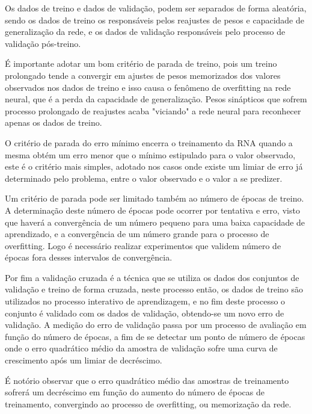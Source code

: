             	Os dados de treino e dados de validação, podem ser separados de forma aleatória, sendo os dados de treino os responsáveis pelos reajustes de pesos e capacidade de generalização da rede, e os dados de validação responsáveis pelo processo de validação pós-treino.
            	
            	É importante adotar um bom critério de parada de treino, pois um treino prolongado tende a convergir em ajustes de pesos memorizados dos valores observados nos dados de treino e isso causa o fenômeno de overfitting na rede neural, que é a perda da capacidade de generalização. Pesos sinápticos que sofrem processo prolongado de reajustes acaba "viciando" a rede neural para reconhecer apenas os dados de treino.
            	
            	O critério de parada do erro mínimo encerra o treinamento da RNA quando a mesma obtém um erro menor que o mínimo estipulado para o valor observado, este é o critério mais simples, adotado nos casos onde existe um limiar de erro já determinado pelo problema, entre o valor observado e o valor a se predizer.
            	
            	Um critério de parada pode ser limitado também ao número de épocas de treino. A determinação  deste número de épocas pode ocorrer por tentativa e erro, visto que haverá a convergência de um número pequeno para uma baixa capacidade de aprendizado, e a convergência de um número grande para o processo de overfitting. Logo é necessário realizar experimentos que validem número de épocas fora desses intervalos de convergência.
            	
            	Por fim a validação cruzada é a técnica que se utiliza os dados dos conjuntos de validação e treino de forma cruzada, neste processo então, os dados de treino são utilizados no processo interativo de aprendizagem, e no fim deste processo o conjunto é validado com os dados de validação, obtendo-se um novo erro de validação.
            	A medição do erro de validação passa por um processo de avaliação em função do número de épocas, a fim de se detectar um ponto de número de épocas onde o erro quadrático médio da amostra de validação sofre uma curva de crescimento após um limiar de decréscimo.
            	
            	É notório observar que o erro quadrático médio das amostras de treinamento sofrerá um decréscimo em função do aumento do número de épocas de treinamento, convergindo ao processo de overfitting, ou memorização da rede.
            	
